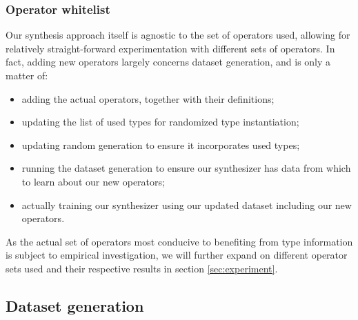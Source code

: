 \documentclass{article}
\begin{document}
\subsubsection{Operator whitelist}

Our synthesis approach itself is agnostic to the set of operators used,
allowing for relatively straight-forward experimentation with different sets of operators.
In fact, adding new operators largely concerns dataset generation, and is only a matter of:
\begin{itemize}
    \item adding the actual operators, together with their definitions;
    \item updating the list of used types for randomized type instantiation;
    \item updating random generation to ensure it incorporates used types;
    \item running the dataset generation to ensure our synthesizer has data from which to learn about our new operators;
    \item actually training our synthesizer using our updated dataset including our new operators.
\end{itemize}

As the actual set of operators most conducive to benefiting
from type information is subject to empirical investigation,
we will further expand on different operator sets used
and their respective results in section \ref{sec:experiment}.

\subsection{Dataset generation}
\end{document}
